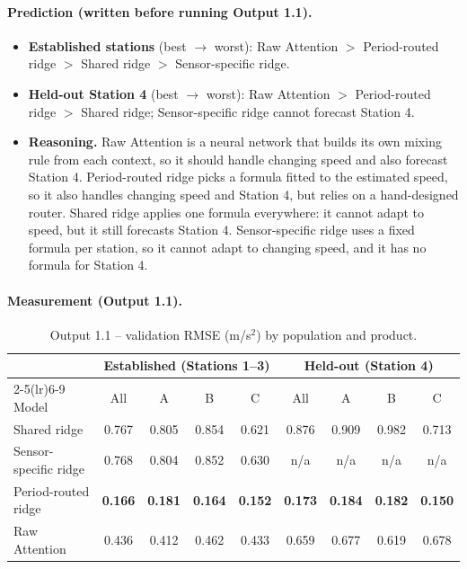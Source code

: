 \documentclass[11pt,a4paper]{article}
\begin{document}
\paragraph{Prediction (written before running Output 1.1).}
\begin{itemize}
  \item \textbf{Established stations} (best $\to$ worst): Raw Attention $>$ Period-routed ridge $>$ Shared ridge $>$ Sensor-specific ridge.
  \item \textbf{Held-out Station 4} (best $\to$ worst): Raw Attention $>$ Period-routed ridge $>$ Shared ridge; Sensor-specific ridge cannot forecast Station 4.
  \item \textbf{Reasoning.} Raw Attention is a neural network that builds its own mixing rule from each context, so it should handle changing speed and also forecast Station 4. Period-routed ridge picks a formula fitted to the estimated speed, so it also handles changing speed and Station 4, but relies on a hand-designed router. Shared ridge applies one formula everywhere: it cannot adapt to speed, but it still forecasts Station 4. Sensor-specific ridge uses a fixed formula per station, so it cannot adapt to changing speed, and it has no formula for Station 4.
\end{itemize}

\paragraph{Measurement (Output 1.1).}
\begin{table}[H]\centering\small
\caption{Output 1.1 -- validation RMSE (m/s$^2$) by population and product.}
\label{tab:out11}
\begin{tabular}{lcccccccc}
\toprule
 & \multicolumn{4}{c}{Established (Stations 1--3)} & \multicolumn{4}{c}{Held-out (Station 4)}\\
\cmidrule(lr){2-5}\cmidrule(lr){6-9}
Model & All & A & B & C & All & A & B & C\\
\midrule
Shared ridge          & 0.767 & 0.805 & 0.854 & 0.621 & 0.876 & 0.909 & 0.982 & 0.713\\
Sensor-specific ridge & 0.768 & 0.804 & 0.852 & 0.630 & n/a & n/a & n/a & n/a\\
Period-routed ridge   & \textbf{0.166} & \textbf{0.181} & \textbf{0.164} & \textbf{0.152} & \textbf{0.173} & \textbf{0.184} & \textbf{0.182} & \textbf{0.150}\\
Raw Attention         & 0.436 & 0.412 & 0.462 & 0.433 & 0.659 & 0.677 & 0.619 & 0.678\\
\bottomrule
\end{tabular}
\end{table}
\end{document}
